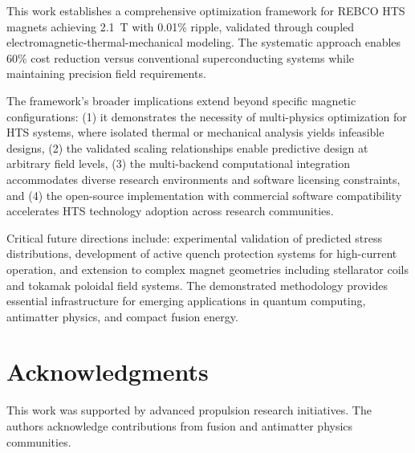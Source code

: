 \documentclass[10pt,twocolumn]{article}
\begin{document}
This work establishes a comprehensive optimization framework for REBCO HTS magnets achieving 2.1~T with 0.01\% ripple, validated through coupled electromagnetic-thermal-mechanical modeling. The systematic approach enables 60\% cost reduction versus conventional superconducting systems while maintaining precision field requirements.

The framework's broader implications extend beyond specific magnetic configurations: (1) it demonstrates the necessity of multi-physics optimization for HTS systems, where isolated thermal or mechanical analysis yields infeasible designs, (2) the validated scaling relationships enable predictive design at arbitrary field levels, (3) the multi-backend computational integration accommodates diverse research environments and software licensing constraints, and (4) the open-source implementation with commercial software compatibility accelerates HTS technology adoption across research communities.

Critical future directions include: experimental validation of predicted stress distributions, development of active quench protection systems for high-current operation, and extension to complex magnet geometries including stellarator coils and tokamak poloidal field systems. The demonstrated methodology provides essential infrastructure for emerging applications in quantum computing, antimatter physics, and compact fusion energy.

\section{Acknowledgments}

This work was supported by advanced propulsion research initiatives. The authors acknowledge contributions from fusion and antimatter physics communities.
\end{document}
